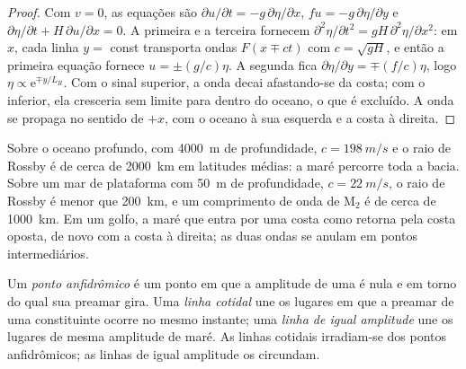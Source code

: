 \begin{proof}
Com $v = 0$, as equações são $\partial u/\partial t = -g\,\partial\eta/
\partial x$, $fu = -g\,\partial\eta/\partial y$ e $\partial\eta/\partial t
+ H\,\partial u/\partial x = 0$. A primeira e a terceira fornecem $\partial^2
\eta/\partial t^2 = gH\,\partial^2\eta/\partial x^2$: em $x$, cada linha
$y = $ const transporta ondas $F(x \mp ct)$ com $c = \sqrt{gH}$, e então a
primeira equação fornece $u = \pm(g/c)\eta$. A segunda fica $\partial\eta/
\partial y = \mp(f/c)\eta$, logo $\eta \propto \mathrm e^{\mp y/L_R}$. Com
o sinal superior, a onda decai afastando-se da costa; com o inferior, ela
cresceria sem limite para dentro do oceano, o que é excluído. A onda se propaga
no sentido de $+x$, com o oceano à sua esquerda e a costa à direita.
\end{proof}

Sobre o oceano profundo, com \qty{4000}{m} de profundidade, $c = \qty{198}{m/s}$ e o
raio de Rossby é de cerca de \qty{2000}{km} em latitudes médias: a maré percorre
toda a bacia. Sobre um mar de plataforma com \qty{50}{m} de profundidade, $c =
\qty{22}{m/s}$, o raio de Rossby é menor que \qty{200}{km}, e um comprimento de onda de M$_2$
é de cerca de \qty{1000}{km}. Em um golfo, a maré que entra por uma
costa como  retorna pela costa oposta, de novo com a
costa à direita; as duas ondas se anulam em pontos intermediários.

\begin{definition}\label{def:b3:ocean-dynamics:amphidrome}
Um \emph{ponto anfidrômico} é um ponto em que a
amplitude de uma  é nula e em torno do qual sua preamar
gira. Uma \emph{linha cotidal} une os lugares em que a
preamar de uma constituinte ocorre no mesmo instante; uma \emph{linha de
igual amplitude} une os lugares de mesma amplitude de maré. As linhas cotidais
irradiam-se dos pontos anfidrômicos; as linhas de igual amplitude os circundam.
\end{definition}

